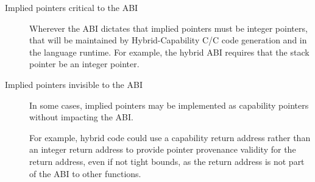\documentclass[12pt,twoside,openright,a4paper]{article}
\newcommand{\ccode}[1]{{\small\ttfamily{#1}}}
\newcommand{\cfunc}[1]{{\ccode{#1()}}}
\newcommand{\futurevariant}[1]{{\color{teal} #1}}
\newcommand{\note}[2]{{\color{blue}[ Note: #1 - #2]}}
\renewcommand{\note}[2]{\relax\ifhmode\unskip\fi}
\newcommand{\rwnote}[1]{\note{#1}{Robert W.}}
\newcommand{\psnote}[1]{\note{#1}{Peter S.}}
\newcommand{\jrtcnote}[1]{\note{#1}{Jess C.}}
\newcommand{\dcnote}[1]{\note{#1}{David}}
\newcommand{\jhbnote}[1]{\note{#1}{John B.}}
\newcommand*{\cpp}{\texorpdfstring{C\textsmaller[2]{\protect\nolinebreak[4]\hspace{-.05em}\raisebox{.45ex}{\textbf{++}}}}{C++}}
\newcommand*{\COrCpp}{C/\cpp{}}
\newcommand*{\hybridCOrCpp}{Hybrid-Capability \COrCpp{}}
\begin{document}
\begin{description}
\item[Implied pointers critical to the ABI]
  Wherever the ABI dictates that implied pointers must be integer pointers,
  that will be maintained by \hybridCOrCpp{} code generation and in the
  language runtime.
  For example, the hybrid ABI requires that the stack pointer be an integer
  pointer.
  \dcnote{This isn't clear to me as a general point.  An ISA that had an
    architectural stack pointer could have a stack capability and define the
    legacy ops that write an integer to the stack pointer to set the address.
    We couldn't do that on MIPS because the stack pointer is non-architectural
    but it would be possible on ARM.}

\item[Implied pointers invisible to the ABI]
  In some cases, implied pointers may be implemented as capability pointers
  without impacting the ABI.

\psnote{again flag more clearly that this is speculative?  The blue colour alone isn't doing it for me}
  
  \futurevariant{For example, hybrid code could use a capability return address
  rather than an integer return address to provide pointer provenance validity
  for the return address, even if not tight bounds, as the return address is
  not part of the ABI to other functions.}

  \jrtcnote{\cfunc{\_\_builtin\_return\_address} does leak these implied
  pointers to some code, and it has implications for things like libunwind, so
  it does affect the ABI. Also the kernel needs to know to put a capability in
  CRA in order for signal handlers to be able to return to \cfunc{sigcode}.
  There's a lot of subtlety here that needs to be captured.}

  \rwnote{I'd been pondering whether the ABI might allow us to use a return
  capability, but in which unwind/etc only looked at the lower 64 bits...  And
  I suppose the builtin could be polymorphic.  But signals are indeed a messy
  issue.
  Is there a better example we could give?}

  \jhbnote{Not as true for MIPS, but on many architectures, the
    position of the saved PC and frame pointer in the stack is part
    of the ABI (if you compile with -fno-omit-frame-pointer as
    FreeBSD's kernel does, and as all of illumos does).  DDB in the
    kernel relies on this convention for stack unwinding even on
    non-x86 platforms like RISC-V.  DTrace also relies on it (so for
    working userspace dtrace FBT probes I think you have to compile
    everything with -fno-omit-frame-pointer).  My knee-jerk reaction
    is that the RA is really part of the ABI in practice.}


\end{description}
\end{document}
